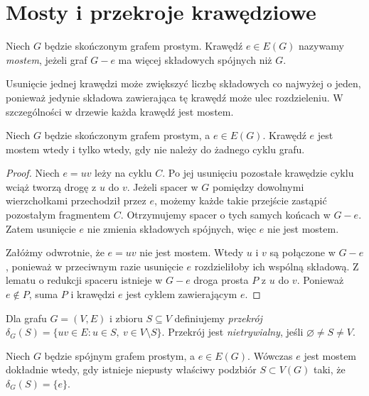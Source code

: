 \section{Mosty i przekroje krawędziowe}
\label{sec:tg-mosty}

\begin{definicja}[Most]
Niech $G$ będzie skończonym grafem prostym.
Krawędź $e\in E(G)$ nazywamy \emph{mostem},
jeżeli graf $G-e$ ma więcej składowych spójnych
niż $G$.
\end{definicja}

Usunięcie jednej krawędzi może zwiększyć liczbę składowych
co najwyżej o jeden, ponieważ jedynie składowa zawierająca
tę krawędź może ulec rozdzieleniu. W szczególności
w drzewie każda krawędź jest mostem.

\begin{twierdzenie}
Niech $G$ będzie skończonym grafem prostym,
a $e\in E(G)$. Krawędź $e$ jest mostem wtedy
i tylko wtedy, gdy nie należy do żadnego cyklu grafu.
\end{twierdzenie}

\begin{proof}
Niech $e=uv$ leży na cyklu $C$. Po jej
usunięciu pozostałe krawędzie cyklu wciąż
tworzą drogę z $u$ do $v$. Jeżeli spacer
w $G$ pomiędzy dowolnymi wierzchołkami
przechodził przez $e$, możemy każde takie
przejście zastąpić pozostałym fragmentem
$C$. Otrzymujemy spacer o tych samych
końcach w $G-e$. Zatem usunięcie $e$
nie zmienia składowych spójnych, więc $e$
nie jest mostem.

Załóżmy odwrotnie, że $e=uv$ nie jest
mostem. Wtedy $u$ i $v$ są połączone
w $G-e$, ponieważ w przeciwnym razie
usunięcie $e$ rozdzieliłoby ich wspólną
składową. Z lematu o redukcji spaceru
istnieje w $G-e$ droga prosta $P$ z $u$
do $v$. Ponieważ $e\notin P$, suma $P$
i krawędzi $e$ jest cyklem zawierającym $e$.
\end{proof}

\begin{definicja}
Dla grafu $G=(V,E)$ i zbioru
$S\subseteq V$ definiujemy \emph{przekrój}
$\delta_G(S)=\{uv\in E:u\in S,\ v\in V\setminus S\}$.
Przekrój jest \emph{nietrywialny}, jeśli
$\varnothing\ne S\ne V$.
\end{definicja}

\begin{stwierdzenie}
Niech $G$ będzie spójnym grafem prostym,
a $e\in E(G)$. Wówczas $e$ jest mostem
dokładnie wtedy, gdy istnieje niepusty
właściwy podzbiór $S\subset V(G)$ taki, że
$\delta_G(S)=\{e\}$.
\end{stwierdzenie}

